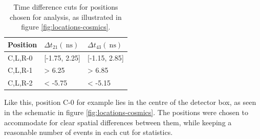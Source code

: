	
	
	\begin{table}[h]
	\centering
    \begin{tabular}{@{}lll@{}}
    \midrule
    Position & $\Delta t_{21} (\SI{}{\nano\second})$ & $\Delta t_{43} (\SI{}{\nano\second})$ \\ \midrule
    C,L,R-0  & {[}-1.75, 2.25{]}                     & {[}-1.15, 2.85{]}                     \\
    C,L,R-1  & \textgreater{} 6.25                    & \textgreater{} 6.85                    \\
    C,L,R-2  & \textless{} -5.75                      & \textless{} -5.15                      \\ \midrule
    \end{tabular}
    \caption{Time difference cuts for positions chosen for analysis, as illustrated in figure \ref{fig:locations-cosmics}.}
    \label{tab:positions}
    \end{table}
	
	Like this, position C-0 for example lies in the centre of the detector box, as seen in the schematic in figure \ref{fig:locations-cosmics}. The positions were chosen to accommodate for clear spatial differences between them, while keeping a reasonable number of events in each cut for statistics.
	

